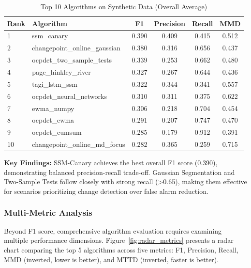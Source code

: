 \documentclass[journal,article,submit,pdftex,moreauthors]{Definitions/mdpi}
\begin{document}
\begin{table}[ht]
\centering
\caption{Top 10 Algorithms on Synthetic Data (Overall Average)}
\label{tab:synthetic_overall}
\small
\begin{tabular}{llcccc}
\toprule
\textbf{Rank} & \textbf{Algorithm} & \textbf{F1} & \textbf{Precision} & \textbf{Recall} & \textbf{MMD} \\
\midrule
1 & ssm\_canary & 0.390 & 0.409 & 0.415 & 0.512 \\
2 & changepoint\_online\_gaussian & 0.380 & 0.316 & 0.656 & 0.437 \\
3 & ocpdet\_two\_sample\_tests & 0.339 & 0.253 & 0.662 & 0.480 \\
4 & page\_hinkley\_river & 0.327 & 0.267 & 0.644 & 0.436 \\
5 & tagi\_lstm\_ssm & 0.322 & 0.344 & 0.341 & 0.557 \\
6 & ocpdet\_neural\_networks & 0.310 & 0.311 & 0.375 & 0.622 \\
7 & ewma\_numpy & 0.306 & 0.218 & 0.704 & 0.454 \\
8 & ocpdet\_ewma & 0.291 & 0.207 & 0.747 & 0.470 \\
9 & ocpdet\_cumsum & 0.285 & 0.179 & 0.912 & 0.391 \\
10 & changepoint\_online\_md\_focus & 0.282 & 0.365 & 0.259 & 0.715 \\
\bottomrule
\end{tabular}
\end{table}

\textbf{Key Findings:} SSM-Canary achieves the best overall F1 score (0.390), demonstrating balanced precision-recall trade-off. Gaussian Segmentation and Two-Sample Tests follow closely with strong recall (>0.65), making them effective for scenarios prioritizing change detection over false alarm reduction.


\subsubsection{Multi-Metric Analysis}

Beyond F1 score, comprehensive algorithm evaluation requires examining multiple performance dimensions. Figure~\ref{fig:radar_metrics} presents a radar chart comparing the top 5 algorithms across five metrics: F1, Precision, Recall, MMD (inverted, lower is better), and MTTD (inverted, faster is better).
\end{document}
